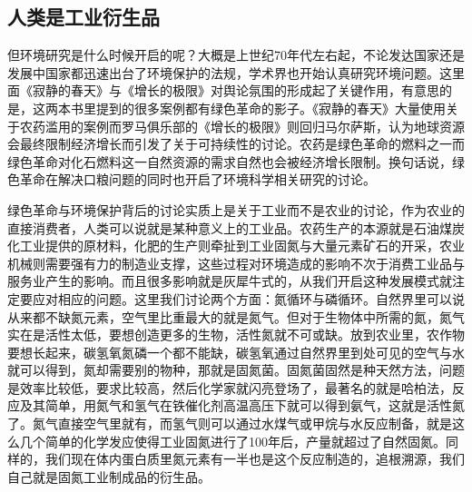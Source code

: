 \documentclass[]{book}
\begin{document}
\subsection{人类是工业衍生品}

但环境研究是什么时候开启的呢？大概是上世纪70年代左右起，不论发达国家还是发展中国家都迅速出台了环境保护的法规，学术界也开始认真研究环境问题。这里面《寂静的春天》与《增长的极限》对舆论氛围的形成起了关键作用，有意思的是，这两本书里提到的很多案例都有绿色革命的影子。《寂静的春天》大量使用关于农药滥用的案例而罗马俱乐部的《增长的极限》则回归马尔萨斯，认为地球资源会最终限制经济增长而引发了关于可持续性的讨论。农药是绿色革命的燃料之一而绿色革命对化石燃料这一自然资源的需求自然也会被经济增长限制。换句话说，绿色革命在解决口粮问题的同时也开启了环境科学相关研究的讨论。

绿色革命与环境保护背后的讨论实质上是关于工业而不是农业的讨论，作为农业的直接消费者，人类可以说就是某种意义上的工业品。农药生产的本源就是石油煤炭化工业提供的原材料，化肥的生产则牵扯到工业固氮与大量元素矿石的开采，农业机械则需要强有力的制造业支撑，这些过程对环境造成的影响不次于消费工业品与服务业产生的影响。而且很多影响就是灰犀牛式的，从我们开启这种发展模式就注定要应对相应的问题。这里我们讨论两个方面：氮循环与磷循环。自然界里可以说从来都不缺氮元素，空气里比重最大的就是氮气。但对于生物体中所需的氮，氮气实在是活性太低，要想创造更多的生物，活性氮就不可或缺。放到农业里，农作物要想长起来，碳氢氧氮磷一个都不能缺，碳氢氧通过自然界里到处可见的空气与水就可以得到，氮却需要别的物种，那就是固氮菌。固氮菌固然是种天然方法，问题是效率比较低，要求比较高，然后化学家就闪亮登场了，最著名的就是哈柏法，反应及其简单，用氮气和氢气在铁催化剂高温高压下就可以得到氨气，这就是活性氮了。氮气直接空气里就有，而氢气则可以通过水煤气或甲烷与水反应制备，就是这么几个简单的化学发应使得工业固氮进行了100年后，产量就超过了自然固氮。同样的，我们现在体内蛋白质里氮元素有一半也是这个反应制造的，追根溯源，我们自己就是固氮工业制成品的衍生品。
\end{document}
